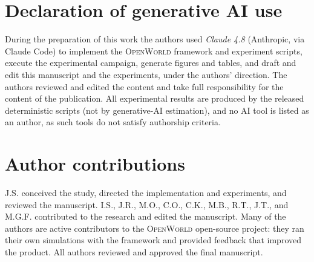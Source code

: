 \documentclass[11pt]{article}
\newcommand{\openworld}{\textsc{OpenWorld}}
\begin{document}
\section*{Declaration of generative AI use}
During the preparation of this work the authors used \emph{Claude 4.8}
(Anthropic, via Claude Code) to implement the \openworld{} framework and
experiment scripts, execute the experimental campaign, generate figures and
tables, and draft and edit this manuscript and the experiments, under the
authors' direction. The authors reviewed and edited the content and
take full responsibility for the content of the publication. All experimental results are produced by the released deterministic scripts (not by
generative-AI estimation), and no AI tool is listed as an author, as such tools do not satisfy
authorship criteria.

\section*{Author contributions}
J.S. conceived the study, directed the implementation and experiments, and
reviewed the manuscript. I.S., J.R., M.O., C.O., C.K., M.B., R.T., J.T., and M.G.F.
contributed to the research and edited the manuscript. Many of the authors are
active contributors to the \openworld{} open-source project: they ran their own
simulations with the framework and provided feedback that improved the product.
All authors reviewed and approved the final manuscript.



\end{document}
